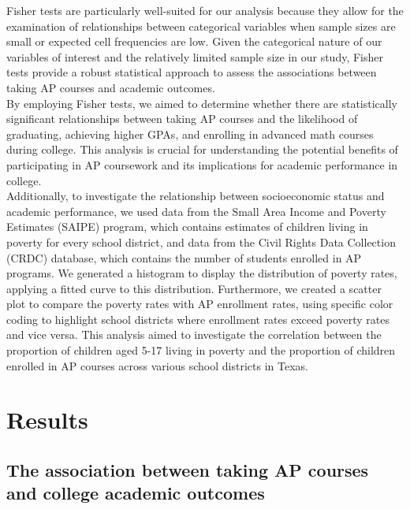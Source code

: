 \documentclass[sn-mathphys-num]{sn-jnl}%
\theoremstyle{thmstyleone}%
\theoremstyle{thmstyletwo}%
\theoremstyle{thmstylethree}%
\begin{document}
{Fisher tests are particularly well-suited for our analysis because they allow for the examination of relationships between categorical variables when sample sizes are small or expected cell frequencies are low. Given the categorical nature of our variables of interest and the relatively limited sample size in our study, Fisher tests provide a robust statistical approach to assess the associations between taking AP courses and academic outcomes.\\

By employing Fisher tests, we aimed to determine whether there are statistically significant relationships between taking AP courses and the likelihood of graduating, achieving higher GPAs, and enrolling in advanced math courses during college. This analysis is crucial for understanding the potential benefits of participating in AP coursework and its implications for academic performance in college.\\

Additionally, to investigate the relationship between socioeconomic status and academic performance, we used data from the Small Area Income and Poverty Estimates (SAIPE) program, which contains estimates of children living in poverty for every school district, and data from the Civil Rights Data Collection (CRDC) database, which contains the number of students enrolled in AP programs. We generated a histogram to display the distribution of poverty rates, applying a fitted curve to this distribution. Furthermore, we created a scatter plot to compare the poverty rates with AP enrollment rates, using specific color coding to highlight school districts where enrollment rates exceed poverty rates and vice versa. This analysis aimed to investigate the correlation between the proportion of children aged 5-17 living in poverty and the proportion of children enrolled in AP courses across various school districts in Texas.\\

\section{Results}\label{sec:Results}

\subsection{The association between taking AP courses and college academic outcomes}
\label{sec:academic}

}
\end{document}
